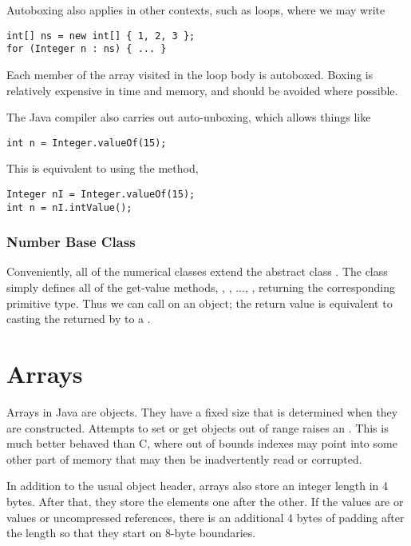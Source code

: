 Autoboxing also applies in other contexts, such as loops, where
we may write
%
\begin{verbatim}
int[] ns = new int[] { 1, 2, 3 };
for (Integer n : ns) { ... }
\end{verbatim}
%
Each member of the array visited in the loop body is autoboxed.
Boxing is relatively expensive in time and memory, and should be
avoided where possible.

The Java compiler also carries out auto-unboxing, which allows things like
%
\begin{verbatim}
int n = Integer.valueOf(15);
\end{verbatim}
%
This is equivalent to using the  method,
%
\begin{verbatim}
Integer nI = Integer.valueOf(15);
int n = nI.intValue();
\end{verbatim}


\subsubsection{Number Base Class}

Conveniently, all of the numerical classes extend the abstract class
.  The class  simply defines all of the
get-value methods, , , ...,
, returning the corresponding primitive type.
Thus we can call  on an  object; the
return value is equivalent to casting the  returned by
 to a .



\section{Arrays}

Arrays in Java are objects.  They have a fixed size that is determined
when they are constructed.  Attempts to set or get objects out of
range raises an .  This is much better
behaved than C, where out of bounds indexes may point into some other
part of memory that may then be inadvertently read or corrupted.

In addition to the usual object header, arrays also store an integer
length in 4 bytes.  After that, they store the elements one after the
other.  If the values are  or  values or
uncompressed references, there is an additional 4 bytes of padding
after the length so that they start on 8-byte boundaries.

